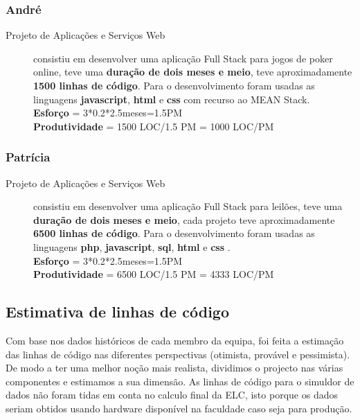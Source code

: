 \documentclass[a4paper]{report}
\begin{document}
\subsubsection*{André}
\begin{description}
    \item[Projeto de Aplicações e Serviços Web] consistiu em desenvolver uma aplicação Full Stack para jogos de poker online, teve uma \textbf{duração de dois meses e meio}, teve aproximadamente \textbf{1500 linhas de código}. Para o desenvolvimento foram usadas as linguagens \textbf{javascript}, \textbf{html} e \textbf{css} com recurso ao MEAN Stack.\\\textbf{Esforço} = 3*0.2*2.5meses=1.5PM\\ \textbf{Produtividade} = 1500 LOC/1.5 PM = 1000 LOC/PM
\end{description}

\subsubsection*{Patrícia}
\begin{description}
    \item[Projeto de Aplicações e Serviços Web] consistiu em desenvolver uma aplicação Full Stack para leilões, teve uma \textbf{duração de dois meses e meio}, cada projeto teve aproximadamente \textbf{6500 linhas de código}. Para o desenvolvimento foram usadas as linguagens \textbf{php}, \textbf{javascript}, \textbf{sql}, \textbf{html} e \textbf{css} .\\\textbf{Esforço} = 3*0.2*2.5meses=1.5PM\\ \textbf{Produtividade} = 6500 LOC/1.5 PM = 4333 LOC/PM
\end{description}
\pagebreak
\subsection{Estimativa de linhas de código}
Com base nos dados históricos de cada membro da equipa, foi feita a estimação das linhas de
código nas diferentes perspectivas (otimista, provável e pessimista). De modo a ter uma melhor noção mais realista, dividimos o projecto nas várias componentes e estimamos a sua dimensão. As linhas de código para o simuldor de dados não foram tidas em conta no calculo final da ELC, isto porque os dados seriam obtidos usando hardware disponível na faculdade caso seja para produção.
\end{document}
